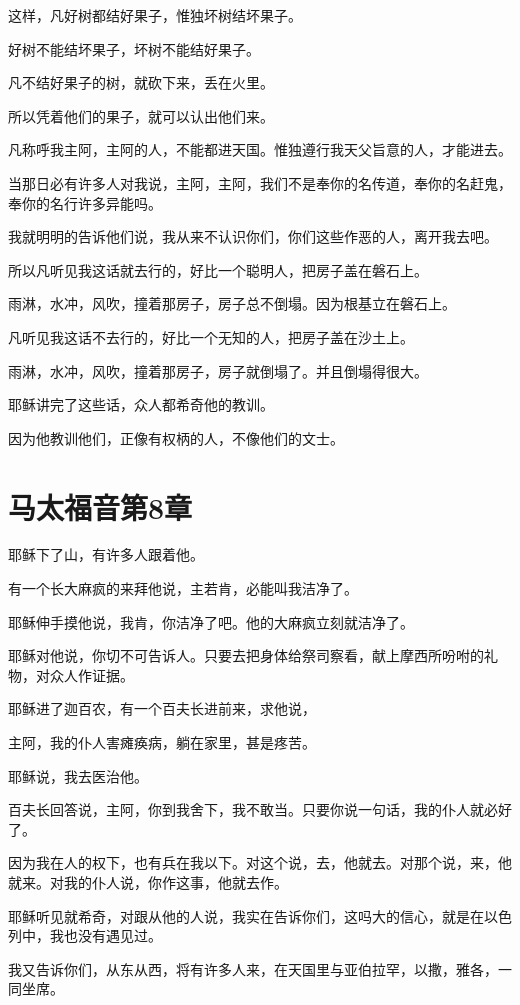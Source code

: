 \documentclass[12pt,oneside]{book}
\begin{document}
这样，凡好树都结好果子，惟独坏树结坏果子。

好树不能结坏果子，坏树不能结好果子。

凡不结好果子的树，就砍下来，丢在火里。

所以凭着他们的果子，就可以认出他们来。

凡称呼我主阿，主阿的人，不能都进天国。惟独遵行我天父旨意的人，才能进去。

当那日必有许多人对我说，主阿，主阿，我们不是奉你的名传道，奉你的名赶鬼，奉你的名行许多异能吗。

我就明明的告诉他们说，我从来不认识你们，你们这些作恶的人，离开我去吧。

所以凡听见我这话就去行的，好比一个聪明人，把房子盖在磐石上。

雨淋，水冲，风吹，撞着那房子，房子总不倒塌。因为根基立在磐石上。

凡听见我这话不去行的，好比一个无知的人，把房子盖在沙土上。

雨淋，水冲，风吹，撞着那房子，房子就倒塌了。并且倒塌得很大。

耶稣讲完了这些话，众人都希奇他的教训。

因为他教训他们，正像有权柄的人，不像他们的文士。

\chapter{马太福音第8章}
耶稣下了山，有许多人跟着他。

有一个长大麻疯的来拜他说，主若肯，必能叫我洁净了。

耶稣伸手摸他说，我肯，你洁净了吧。他的大麻疯立刻就洁净了。

耶稣对他说，你切不可告诉人。只要去把身体给祭司察看，献上摩西所吩咐的礼物，对众人作证据。

耶稣进了迦百农，有一个百夫长进前来，求他说，

主阿，我的仆人害瘫痪病，躺在家里，甚是疼苦。

耶稣说，我去医治他。

百夫长回答说，主阿，你到我舍下，我不敢当。只要你说一句话，我的仆人就必好了。

因为我在人的权下，也有兵在我以下。对这个说，去，他就去。对那个说，来，他就来。对我的仆人说，你作这事，他就去作。

耶稣听见就希奇，对跟从他的人说，我实在告诉你们，这吗大的信心，就是在以色列中，我也没有遇见过。

我又告诉你们，从东从西，将有许多人来，在天国里与亚伯拉罕，以撒，雅各，一同坐席。
\end{document}

